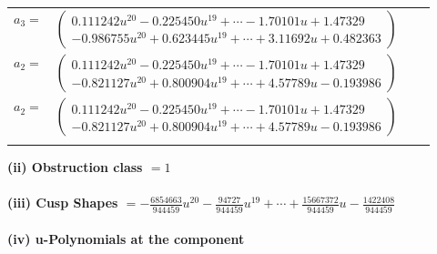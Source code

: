 \documentclass[1p]{elsarticle_modified}
\theoremstyle{definition}
\begin{document}
\begin{tabular}{m{7pt} m{180pt} m{7pt} m{180pt} }
\flushright $a_{3}=$&$\begin{pmatrix}0.111242 u^{20}-0.225450 u^{19}+\cdots-1.70101 u+1.47329\\-0.986755 u^{20}+0.623445 u^{19}+\cdots+3.11692 u+0.482363\end{pmatrix}$ \\
\flushright $a_{2}=$&$\begin{pmatrix}0.111242 u^{20}-0.225450 u^{19}+\cdots-1.70101 u+1.47329\\-0.821127 u^{20}+0.800904 u^{19}+\cdots+4.57789 u-0.193986\end{pmatrix}$\\ \flushright $a_{2}=$&$\begin{pmatrix}0.111242 u^{20}-0.225450 u^{19}+\cdots-1.70101 u+1.47329\\-0.821127 u^{20}+0.800904 u^{19}+\cdots+4.57789 u-0.193986\end{pmatrix}$\\&\end{tabular}
\flushleft \textbf{(ii) Obstruction class $= 1$}\\~\\
\flushleft \textbf{(iii) Cusp Shapes $= -\frac{6854663}{944459} u^{20}-\frac{94727}{944459} u^{19}+\cdots+\frac{15667372}{944459} u-\frac{1422408}{944459}$}\\~\\
\newpage\renewcommand{\arraystretch}{1}
\flushleft \textbf{(iv) u-Polynomials at the component}\newline \\
\end{document}
